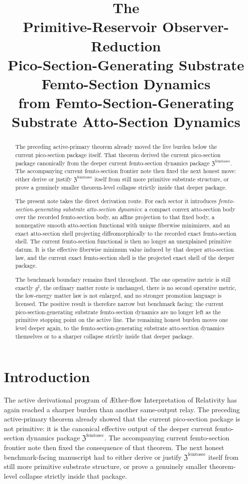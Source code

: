 \documentclass[11pt]{article}
\title{\textbf{The \TheoryName{}}\\[0.4em]
\large Primitive-Reservoir Observer-Reduction\\
\large Pico-Section-Generating Substrate Femto-Section Dynamics\\
\large from Femto-Section-Generating Substrate Atto-Section Dynamics}
\author{}
\date{}
\newcommand{\Aflow}{\AE{}ther-flow}
\newcommand{\TheoryName}{\Aflow{} Interpretation of Relativity}
\newcommand{\CompletedMetric}{g^{\sharp}}
\newcommand{\FemtoSectionPackage}{\mathfrak Z^{\mathrm{femtosec}}}
\begin{document}
\maketitle

\begin{abstract}
The preceding active-primary theorem already moved the live burden below the current pico-section package itself. That theorem derived the current pico-section package canonically from the deeper current femto-section dynamics package \(\FemtoSectionPackage\). The accompanying current femto-section frontier note then fixed the next honest move: either derive or justify \(\FemtoSectionPackage\) itself from still more primitive substrate structure, or prove a genuinely smaller theorem-level collapse strictly inside that deeper package.

The present note takes the direct derivation route. For each sector it introduces \emph{femto-section-generating substrate atto-section dynamics}: a compact convex atto-section body over the recorded femto-section body, an affine projection to that fixed body, a nonnegative smooth atto-section functional with unique fiberwise minimizers, and an exact atto-section shell projecting diffeomorphically to the recorded exact femto-section shell. The current femto-section functional is then no longer an unexplained primitive datum. It is the effective fiberwise minimum value induced by that deeper atto-section law, and the current exact femto-section shell is the projected exact shell of the deeper package.

The benchmark boundary remains fixed throughout. The one operative metric is still exactly \(\CompletedMetric\), the ordinary matter route is unchanged, there is no second operative metric, the low-energy matter law is not enlarged, and no stronger promotion language is licensed. The positive result is therefore narrow but benchmark facing: the current pico-section-generating substrate femto-section dynamics are no longer left as the primitive stopping point on the active line. The remaining honest burden moves one level deeper again, to the femto-section-generating substrate atto-section dynamics themselves or to a sharper collapse strictly inside that deeper package.
\end{abstract}

\section{Introduction}

The active derivational program of \TheoryName{} has again reached a sharper burden than another same-output relay. The preceding active-primary theorem already showed that the current pico-section package is not primitive: it is the canonical effective output of the deeper current femto-section dynamics package \(\FemtoSectionPackage\). The accompanying current femto-section frontier note then fixed the consequence of that theorem. The next honest benchmark-facing manuscript had to either derive or justify \(\FemtoSectionPackage\) itself from still more primitive substrate structure, or prove a genuinely smaller theorem-level collapse strictly inside that package.
\end{document}
